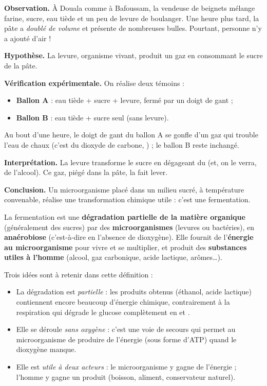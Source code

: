 \documentclass[11pt]{article}
\newcommand{\cle}[1]{{\popxbold\color{popdark}#1}}
\newcounter{popsec}
\newcounter{popsub}
\newcommand{\courssub}[1]{%
  \stepcounter{popsub}%
  \par\vspace{9pt}\noindent{\popxbold\fontsize{11.5}{13}\selectfont\color{popink}{\color{poporange}\thepopsec.\thepopsub}\hspace{6pt}#1}\par\nopagebreak\vspace{4pt}
}
\begin{document}
\begin{experience}
\textbf{Observation.} À Douala comme à Bafoussam, la vendeuse de beignets mélange farine, sucre, eau tiède et un peu de levure de boulanger. Une heure plus tard, la pâte a \emph{doublé de volume} et présente de nombreuses bulles. Pourtant, personne n'y a ajouté d'air !

\textbf{Hypothèse.} La levure, organisme vivant, produit un gaz en consommant le sucre de la pâte.

\textbf{Vérification expérimentale.} On réalise deux témoins :
\begin{itemize}
\item \textbf{Ballon A} : eau tiède + sucre + levure, fermé par un doigt de gant ;
\item \textbf{Ballon B} : eau tiède + sucre seul (sans levure).
\end{itemize}
Au bout d'une heure, le doigt de gant du ballon A se gonfle d'un gaz qui trouble l'eau de chaux (c'est du dioxyde de carbone, ) ; le ballon B reste inchangé.

\textbf{Interprétation.} La levure transforme le sucre en dégageant du  (et, on le verra, de l'alcool). Ce gaz, piégé dans la pâte, la fait lever.

\textbf{Conclusion.} Un microorganisme placé dans un milieu sucré, à température convenable, réalise une transformation chimique utile : c'est une \cle{fermentation}.
\end{experience}

\courssub{Définition de la fermentation}

\begin{definition}[La fermentation]
La \cle{fermentation} est une \textbf{dégradation partielle de la matière organique} (généralement des sucres) par des \textbf{microorganismes} (levures ou bactéries), en \textbf{anaérobiose} (c'est-à-dire en l'absence de dioxygène). Elle fournit de l'\textbf{énergie au microorganisme} pour vivre et se multiplier, et produit des \textbf{substances utiles à l'homme} (alcool, gaz carbonique, acide lactique, arômes\ldots).
\end{definition}

Trois idées sont à retenir dans cette définition :
\begin{itemize}
\item La dégradation est \emph{partielle} : les produits obtenus (éthanol, acide lactique) contiennent encore beaucoup d'énergie chimique, contrairement à la respiration qui dégrade le glucose complètement en  et .
\item Elle se déroule \emph{sans oxygène} : c'est une voie de secours qui permet au microorganisme de produire de l'énergie (sous forme d'ATP) quand le dioxygène manque.
\item Elle est \emph{utile à deux acteurs} : le microorganisme y gagne de l'énergie ; l'homme y gagne un produit (boisson, aliment, conservateur naturel).
\end{itemize}
\end{document}
